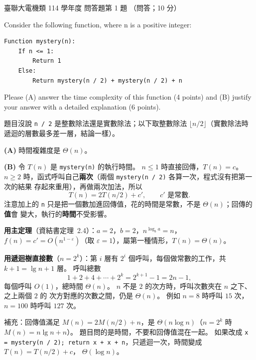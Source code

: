 \begin{pastexam}[label={px:ust-114-ee-ds-25}]{臺聯大電機類 114 學年度 問答題第 1 題}
（問答；10 分）

Consider the following function, where n is a positive integer:
\begin{verbatim}
Function mystery(n):
    If n <= 1:
        Return 1
    Else:
        Return mystery(n / 2) + mystery(n / 2) + n
\end{verbatim}
Please (A) answer the time complexity of this function (4 points) and (B) justify your answer with a
detailed explanation (6 points).
\end{pastexam}

\begin{pastsoln}
題目沒說 \texttt{n / 2} 是整數除法還是實數除法；以下取整數除法 $\lfloor n/2 \rfloor$（實數除法時
遞迴的層數最多差一層，結論一樣）。

\textbf{(A)} 時間複雜度是 $\Theta(n)$。

\textbf{(B)} 令 $T(n)$ 是 \texttt{mystery(n)} 的執行時間。 $n \le 1$ 時直接回傳，$T(n) = c$。
$n \ge 2$ 時，函式呼叫自己\textbf{兩次}（兩個 \texttt{mystery(n / 2)} 各算一次，程式沒有把第一次的結果
存起來重用），再做兩次加法，所以
\[
T(n) = 2T(n/2) + c' , \qquad c' \text{ 是常數}.
\]
注意加上的 \texttt{n} 只是把一個數加進回傳值，花的時間是常數，不是 $\Theta(n)$；回傳的\textbf{值}會
變大，執行的\textbf{時間}不受影響。

\textbf{用主定理}（資結書定理~2.4）：$a = 2$，$b = 2$，$n^{\log_b a} = n$，$f(n) = c' =
O(n^{1 - \varepsilon})$（取 $\varepsilon = 1$），屬第一種情形，$T(n) = \Theta(n)$。

\textbf{用遞迴樹直接數}（$n = 2^k$）：第 $i$ 層有 $2^i$ 個呼叫，每個做常數的工作，共 $k + 1 = \lg n + 1$
層。 呼叫總數
\[
1 + 2 + 4 + \cdots + 2^{k} = 2^{k+1} - 1 = 2n - 1 ,
\]
每個呼叫 $O(1)$，總時間 $\Theta(n)$。 $n$ 不是 $2$ 的次方時，呼叫次數夾在 $n$ 之下、之上兩個 $2$ 的
次方對應的次數之間，仍是 $\Theta(n)$。 例如 $n = 8$ 時呼叫 $15$ 次，$n = 100$ 時呼叫 $127$ 次。

補充：回傳值滿足 $M(n) = 2M(n/2) + n$，是 $\Theta(n \log n)$（$n = 2^k$ 時
$M(n) = n\lg n + n$）。 題目問的是時間，不要和回傳值混在一起。 如果改成
\texttt{x = mystery(n / 2); return x + x + n}，只遞迴一次，時間變成 $T(n) = T(n/2) + c$，
$\Theta(\log n)$。
\end{pastsoln}

